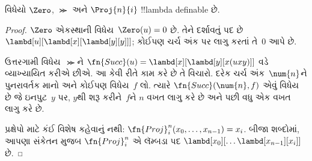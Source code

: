 \documentclass[../../../include/open-logic-section]{subfiles}
\begin{document}

\begin{lem}
વિધેયો $\Zero$, $\Succ$ અને $\Proj{n}{i}$ !!{lambda definable} છે.
\end{lem}

\begin{proof}
$\Zero$ એકસ્થાની વિધેય~$\Zero(u)=0$ છે. તેને દર્શાવતું પદ છે
$\lambd[u][\lambd[x][\lambd[y][y]]]$; કોઈપણ ચર્ચ અંક પર લાગુ
કરતાં તે~$\num{0}$ આપે છે.

ઉત્તરગામી વિધેય~$\Succ$ને
$\fn{Succ}(u) = \lambd[x][\lambd[y][x(uxy)]]$ વડે વ્યાખ્યાયિત
કરીએ છીએ. આ કેવી રીતે કામ કરે છે તે વિચારો. દરેક ચર્ચ અંક~$\num{n}$ને
પુનરાવર્તક માનો અને કોઈપણ વિધેય~$f$ લો. ત્યારે
$\fn{Succ}(\num{n},f)$ એવું વિધેય છે જે ઇનપુટ~$y$ પર, $y$થી
શરૂ કરીને~$f$ને $n$ વખત લાગુ કરે છે અને પછી વધુ એક વખત લાગુ કરે છે.

પ્રક્ષેપો માટે કંઈ વિશેષ કહેવાનું નથી:
$\fn{Proj}^n_i(x_0, \dots, x_{n-1}) = x_i$. બીજા શબ્દોમાં,
આપણા સંકેતન મુજબ $\fn{Proj}^n_i$ એ લૅમ્બડા પદ
$\lambd[x_0][\dots \lambd[x_{n-1}][x_i]]$ છે.
\end{proof}
\end{document}
